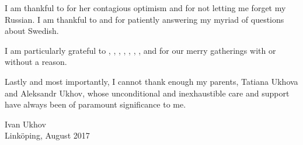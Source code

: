 I am thankful to  for her contagious optimism and
for not letting me forget my Russian. I am thankful to 
and  for patiently answering my myriad of questions about
Swedish.

I am particularly grateful to , ,
, , ,
, , and
 for our merry gatherings with or without a reason.

Lastly and most importantly, I cannot thank enough my parents, Tatiana Ukhova
and Aleksandr Ukhov, whose unconditional and inexhaustible care and support have
always been of paramount significance to me.

\vspace{4em}
\hfill
\begin{minipage}{0.35\textwidth}
Ivan Ukhov\\
Linköping, August 2017
\end{minipage}

